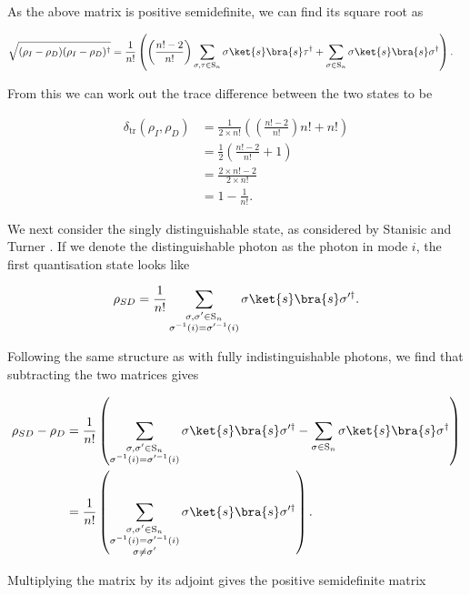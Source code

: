 As the above matrix is positive semidefinite, we can find its square root as

\begin{align}
\sqrt{(\rho_I - \rho_D)(\rho_I - \rho_D)^\dagger} &= \frac{1}{n!}\left(\left(\frac{n!-2}{n!}\right)\sum_{\sigma,\tau\in\textrm{S}_n}\sigma\ket{s}\bra{s}\tau^\dagger + \sum_{\sigma \in \textrm{S}_n}\sigma\ket{s}\bra{s}\sigma^\dagger\right).
\end{align}

From this we can work out the trace difference between the two states to be

\begin{align}
\delta_{\mathrm{tr}}(\rho_I, \rho_D) &= \frac{1}{2\times n!}\left(\left(\frac{n!-2}{n!}\right)n! + n!\right)\\
&= \frac{1}{2}\left(\frac{n!-2}{n!} + 1\right)\\
&= \frac{2 \times n! - 2}{2 \times n!}\\
&= 1 - \frac{1}{n!}.
\end{align}

We next consider the singly distinguishable state, as considered by Stanisic and Turner \cite{stanisic2018}. If we denote the distinguishable photon as the photon in mode $i$, the first quantisation state looks like

$$\rho_{SD} = \frac{1}{n!}\sum_{\substack{\sigma,\sigma'\in\textrm{S}_n\\\sigma^{-1}(i)=\sigma'^{-1}(i)}}\sigma\ket{s}\bra{s}\sigma'^\dagger.$$

Following the same structure as with fully indistinguishable photons, we find that subtracting the two matrices gives

\begin{align}
\rho_{SD} - \rho_D &= \frac{1}{n!}\left(\sum_{\substack{\sigma,\sigma'\in\textrm{S}_n\\\sigma^{-1}(i)=\sigma'^{-1}(i)}}\sigma\ket{s}\bra{s}\sigma'^\dagger - \sum_{\sigma \in \textrm{S}_n}\sigma\ket{s}\bra{s}\sigma^\dagger\right)\\
&= \frac{1}{n!}\left(\sum_{\substack{\sigma,\sigma'\in\textrm{S}_n\\\sigma^{-1}(i)=\sigma'^{-1}(i)\\\sigma\neq\sigma'}}\sigma\ket{s}\bra{s}\sigma'^\dagger\right).
\end{align}

Multiplying the matrix by its adjoint gives the positive semidefinite matrix

